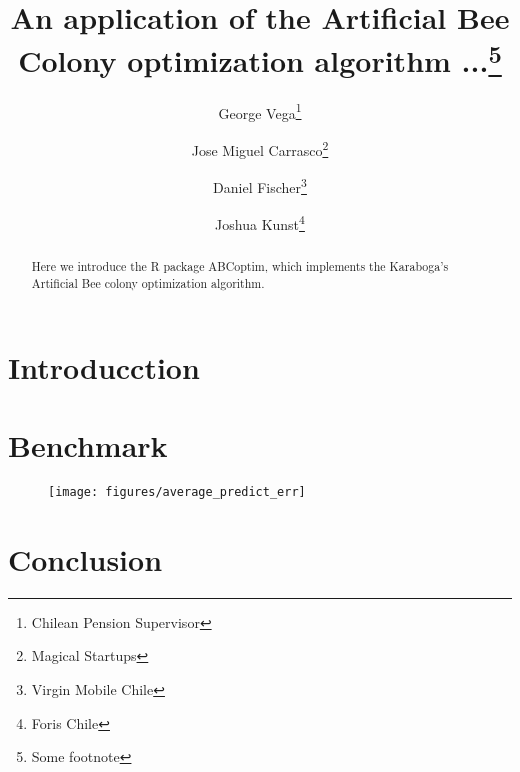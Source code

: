 \documentclass{article}
\title{An application of the Artificial Bee Colony optimization algorithm ...\footnote{Some footnote}}
\author{
George Vega\thanks{Chilean Pension Supervisor} \and
Jose Miguel Carrasco\thanks{Magical Startups} \and
Daniel Fischer\thanks{Virgin Mobile Chile} \and
Joshua Kunst\thanks{Foris Chile}
}
\begin{document}
\maketitle

\begin{abstract}
Here we introduce the R package ABCoptim, which implements the Karaboga's 
Artificial Bee colony optimization algorithm.
\end{abstract}

\section{Introducction}



\section{Benchmark}

\begin{figure}
\texttt{[image: figures/average\_predict\_err]}
\end{figure}



\section{Conclusion}
\end{document}
